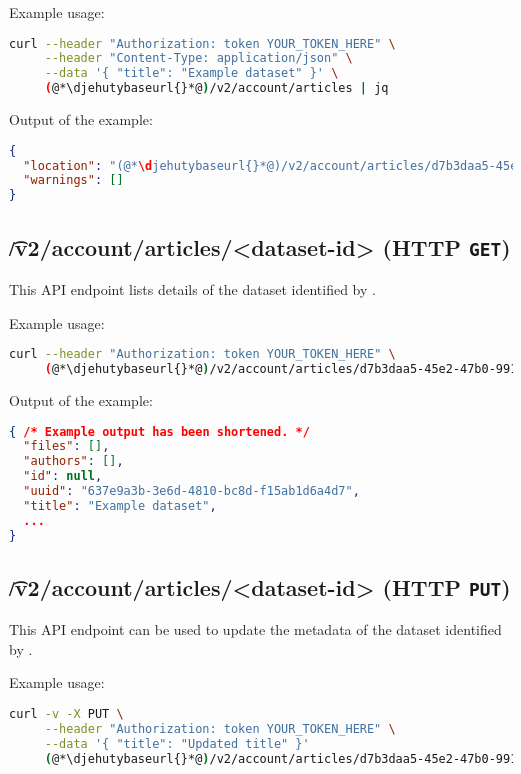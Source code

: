   Example usage:
\begin{lstlisting}[language=bash]
curl --header "Authorization: token YOUR_TOKEN_HERE" \
     --header "Content-Type: application/json" \
     --data '{ "title": "Example dataset" }' \
     (@*\djehutybaseurl{}*@)/v2/account/articles | jq
\end{lstlisting}

  Output of the example:
\begin{lstlisting}[language=JSON]
{
  "location": "(@*\djehutybaseurl{}*@)/v2/account/articles/d7b3daa5-45e2-47b0-9910-0f7fa6a995b1",
  "warnings": []
}
\end{lstlisting}

\subsection{\t{/v2/account/articles/<dataset-id>} (HTTP \texttt{GET})}

  This API endpoint lists details of the dataset identified by .

  Example usage:
\begin{lstlisting}[language=bash]
curl --header "Authorization: token YOUR_TOKEN_HERE" \
     (@*\djehutybaseurl{}*@)/v2/account/articles/d7b3daa5-45e2-47b0-9910-0f7fa6a995b1 | jq
\end{lstlisting}

  Output of the example:
\begin{lstlisting}[language=JSON]
{ /* Example output has been shortened. */
  "files": [],
  "authors": [],
  "id": null,
  "uuid": "637e9a3b-3e6d-4810-bc8d-f15ab1d6a4d7",
  "title": "Example dataset",
  ...
}
\end{lstlisting}

\subsection{\t{/v2/account/articles/<dataset-id>} (HTTP \texttt{PUT})}

  This API endpoint can be used to update the metadata of the dataset
  identified by .

  Example usage:
\begin{lstlisting}[language=bash]
curl -v -X PUT \
     --header "Authorization: token YOUR_TOKEN_HERE" \
     --data '{ "title": "Updated title" }'
     (@*\djehutybaseurl{}*@)/v2/account/articles/d7b3daa5-45e2-47b0-9910-0f7fa6a995b1 | jq
\end{lstlisting}

